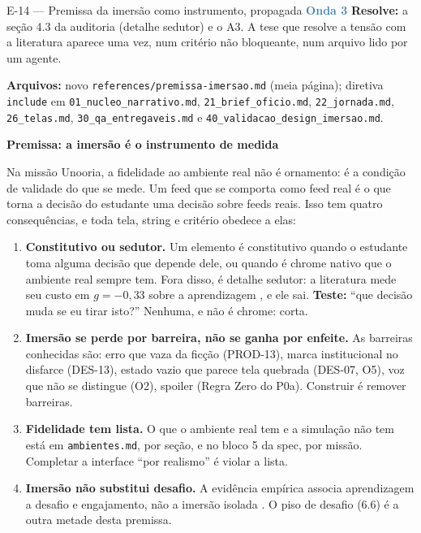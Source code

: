 \documentclass[11pt,a4paper]{article}
\newcommand{\onda}[1]{\textcolor{SteelBlue}{\textbf{Onda #1}}}
\begin{document}
\begin{emendabox}{E-14 --- Premissa da imersão como instrumento, propagada \hfill \onda{3}}
\textbf{Resolve:} a seção 4.3 da auditoria (detalhe sedutor) e o A3. A tese que resolve a tensão
com a literatura aparece uma vez, num critério não bloqueante, num arquivo lido por um agente.

\textbf{Arquivos:} novo \texttt{references/premissa-imersao.md} (meia página); diretiva
\texttt{include} em \texttt{01\_nucleo\_narrativo.md}, \texttt{21\_brief\_oficio.md},
\texttt{22\_jornada.md}, \texttt{26\_telas.md}, \texttt{30\_qa\_entregaveis.md} e
\texttt{40\_validacao\_design\_imersao.md}.

\begin{depoisbox}\small
\textbf{Premissa: a imersão é o instrumento de medida}

Na missão Unooria, a fidelidade ao ambiente real não é ornamento: é a condição de validade do
que se mede. Um feed que se comporta como feed real é o que torna a decisão do estudante uma
decisão sobre feeds reais. Isso tem quatro consequências, e toda tela, string e critério obedece
a elas:

\begin{enumerate}
  \item \textbf{Constitutivo ou sedutor.} Um elemento é constitutivo quando o estudante toma alguma
        decisão que depende dele, ou quando é chrome nativo que o ambiente real sempre tem. Fora
        disso, é detalhe sedutor: a literatura mede seu custo em $g = -0{,}33$ sobre a aprendizagem
        \cite{sundararajan2020}, e ele sai. \textbf{Teste:} ``que decisão muda se eu tirar isto?''
        Nenhuma, e não é chrome: corta.
  \item \textbf{Imersão se perde por barreira, não se ganha por enfeite.} As barreiras conhecidas
        são: erro que vaza da ficção (PROD-13), marca institucional no disfarce (DES-13), estado
        vazio que parece tela quebrada (DES-07, O5), voz que não se distingue (O2), spoiler (Regra
        Zero do P0a). Construir é remover barreiras.
  \item \textbf{Fidelidade tem lista.} O que o ambiente real tem e a simulação não tem está em
        \texttt{ambientes.md}, por seção, e no bloco 5 da spec, por missão. Completar a interface
        ``por realismo'' é violar a lista.
  \item \textbf{Imersão não substitui desafio.} A evidência empírica associa aprendizagem a
        desafio e engajamento, não a imersão isolada \cite{hamari2016, cheng2015}. O piso de
        desafio (6.6) é a outra metade desta premissa.
\end{enumerate}
\end{depoisbox}


\end{emendabox}
\end{document}
